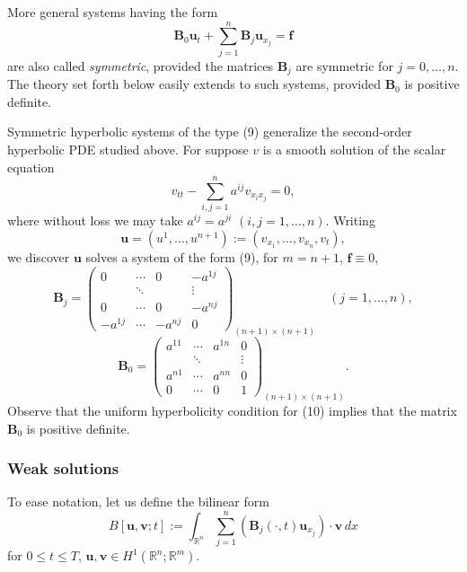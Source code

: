 \begin{remark}
\label{rem:symmetric-hyperbolic-general-systems}
More general systems having the form
\[
\mathbf{B}_0\mathbf{u}_t + \sum_{j=1}^n \mathbf{B}_j\mathbf{u}_{x_j} = \mathbf{f}
\tag{9}
\]
are also called \textit{symmetric}, provided the matrices $\mathbf{B}_j$ are symmetric for $j = 0,\ldots,n$. The theory set forth below easily extends to such systems, provided $\mathbf{B}_0$ is positive definite.

Symmetric hyperbolic systems of the type (9) generalize the second-order hyperbolic PDE studied above. For suppose $v$ is a smooth solution of the scalar equation
\[
v_{tt} - \sum_{i,j=1}^n a^{ij}v_{x_ix_j} = 0,
\tag{10}
\]
where without loss we may take $a^{ij} = a^{ji}$ $(i,j = 1,\ldots,n)$. Writing
\[
\mathbf{u} = (u^1,\ldots,u^{n+1}) := (v_{x_1},\ldots,v_{x_n},v_t),
\]
we discover $\mathbf{u}$ solves a system of the form (9), for $m = n+1$, $\mathbf{f} \equiv 0$,
\[
\mathbf{B}_j = \begin{pmatrix} 0 & \cdots & 0 & -a^{1j} \\ & \ddots & & \vdots \\ 0 & \cdots & 0 & -a^{nj} \\ -a^{1j} & \cdots & -a^{nj} & 0 \end{pmatrix}_{(n+1)\times(n+1)} \quad (j = 1,\ldots,n),
\]
\[
\mathbf{B}_0 = \begin{pmatrix} a^{11} & \cdots & a^{1n} & 0 \\ & \ddots & & \vdots \\ a^{n1} & \cdots & a^{nn} & 0 \\ 0 & \cdots & 0 & 1 \end{pmatrix}_{(n+1)\times(n+1)}.
\]
Observe that the uniform hyperbolicity condition for (10) implies that the matrix $\mathbf{B}_0$ is positive definite.
\end{remark}

\subsubsection{Weak solutions}

To ease notation, let us define the bilinear form
\[
B[\mathbf{u},\mathbf{v};t] := \int_{\mathbb{R}^n} \sum_{j=1}^n (\mathbf{B}_j(\cdot,t)\mathbf{u}_{x_j}) \cdot \mathbf{v} \, dx
\]
for $0 \le t \le T$, $\mathbf{u}, \mathbf{v} \in H^1(\mathbb{R}^n; \mathbb{R}^m)$.

